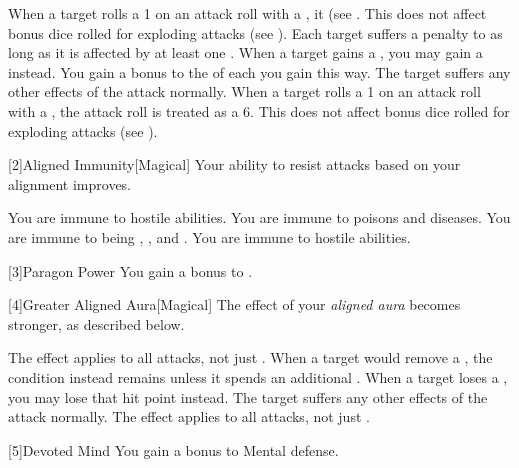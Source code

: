          When a target rolls a 1 on an attack roll with a , it  (see .
        This does not affect bonus dice rolled for exploding attacks (see ).
         Each target suffers a  penalty to  as long as it is affected by at least one .
         When a target gains a , you may gain a  instead.
        You gain a  bonus to the  of each  you gain this way.
        The target suffers any other effects of the attack normally.
         When a target rolls a 1 on an attack roll with a , the attack roll is treated as a 6.
        This does not affect bonus dice rolled for exploding attacks (see ).

        [2]{Aligned Immunity}[Magical]
        Your ability to resist attacks based on your alignment improves.

         You are immune to hostile  abilities.
         You are immune to poisons and diseases.
         You are immune to being , , and .
         You are immune to hostile  abilities.

        [3]{Paragon Power}
        You gain a  bonus to .

        [4]{Greater Aligned Aura}[Magical]
        The effect of your \textit{aligned aura} becomes stronger, as described below.

         The effect applies to all attacks, not just .
         When a target would remove a , the condition instead remains unless it spends an additional .
         When a target loses a , you may lose that hit point instead.
        The target suffers any other effects of the attack normally.
         The effect applies to all attacks, not just .

        [5]{Devoted Mind} You gain a  bonus to Mental defense.

